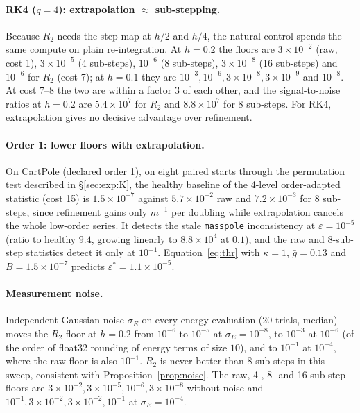 \documentclass[10pt]{article}
\theoremstyle{definition}
\begin{document}
\paragraph{RK4 ($q=4$): extrapolation $\approx$ sub-stepping.} Because $R_2$ needs the step map at $h/2$ and $h/4$, the
natural control spends the same compute on plain re-integration. At $h=0.2$ the floors are $3\times10^{-2}$ (raw, cost 1),
$3\times10^{-5}$ (4 sub-steps), $10^{-6}$ (8 sub-steps), $3\times10^{-8}$ (16 sub-steps) and $10^{-6}$ for $R_2$ (cost 7); at
$h=0.1$ they are $10^{-3},10^{-6},3\times10^{-8},3\times10^{-9}$ and $10^{-8}$. At cost 7--8 the two are within a factor 3
of each other, and the signal-to-noise ratios at $h=0.2$ are $5.4\times10^7$ for $R_2$ and $8.8\times10^7$ for 8 sub-steps.
For RK4, extrapolation gives no decisive advantage over refinement.

\paragraph{Order 1: lower floors with extrapolation.} On CartPole (declared order 1), on eight paired
starts through the permutation test described in \S\ref{sec:exp:K}, the healthy baseline of the 4-level order-adapted statistic (cost 15) is
$1.5\times10^{-7}$ against $5.7\times10^{-2}$ raw and $7.2\times10^{-3}$ for 8 sub-steps, since refinement gains only $m^{-1}$ per
doubling while extrapolation cancels the whole low-order series. It detects the stale \texttt{masspole} inconsistency at
$\varepsilon=10^{-5}$ (ratio to healthy $9.4$, growing linearly to $8.8\times10^4$ at $0.1$), and the raw and 8-sub-step
statistics detect it only at $10^{-1}$. Equation~\eqref{eq:thr} with $\kappa=1$, $\bar g=0.13$ and $B=1.5\times10^{-7}$ predicts
$\varepsilon^*=1.1\times10^{-5}$.

\paragraph{Measurement noise.} Independent Gaussian noise $\sigma_E$ on every energy evaluation (20 trials, median) moves the
$R_2$ floor at $h=0.2$ from $10^{-6}$ to $10^{-5}$ at $\sigma_E=10^{-8}$, to $10^{-3}$ at $10^{-6}$ (of the order of float32
rounding of energy terms of size $10$), and to $10^{-1}$ at $10^{-4}$, where the raw floor is also $10^{-1}$.
$R_2$ is never better than 8 sub-steps in this sweep, consistent with Proposition~\ref{prop:noise}.
The raw, 4-, 8- and 16-sub-step floors are $3\times10^{-2},3\times10^{-5},10^{-6},3\times10^{-8}$ without noise and $10^{-1},3\times10^{-2},3\times10^{-2},10^{-1}$ at $\sigma_E=10^{-4}$.
\end{document}

